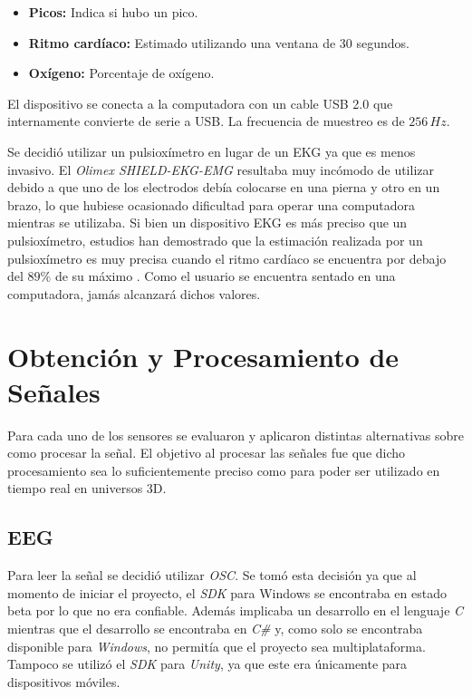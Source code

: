 \begin{itemize}
\item \textbf{Picos:}  Indica si hubo un pico.
\item \textbf{Ritmo cardíaco:} Estimado utilizando una ventana de 30 segundos.
\item \textbf{Oxígeno:} Porcentaje de oxígeno.
\end{itemize} 

El dispositivo se conecta a la computadora con un cable USB 2.0 que internamente convierte de serie a USB. La frecuencia de muestreo es de $256 \, Hz$.

Se decidió utilizar un pulsioxímetro en lugar de un EKG ya que es menos invasivo. El \emph{Olimex SHIELD-EKG-EMG} resultaba muy incómodo de utilizar debido a que uno de los electrodos debía colocarse en una pierna y otro en un brazo, lo que hubiese ocasionado dificultad para operar una computadora mientras se utilizaba. Si bien un dispositivo EKG es más preciso que un pulsioxímetro, estudios han demostrado que la estimación realizada por un pulsioxímetro es muy precisa cuando el ritmo cardíaco se encuentra por debajo del $89\% $ de su máximo \cite{spo2-accuracy}. Como el usuario se encuentra sentado en una computadora, jamás alcanzará dichos valores.

\section{Obtención y Procesamiento de Señales}

Para cada uno de los sensores se evaluaron y aplicaron distintas alternativas sobre como procesar la señal. El objetivo al procesar las señales fue que dicho procesamiento sea lo suficientemente preciso como para poder ser utilizado en tiempo real en universos 3D.

\subsection{EEG} \label{sec:eeg-signal-processing}

Para leer la señal se decidió utilizar \emph{OSC}. Se tomó esta decisión ya que al momento de iniciar el proyecto, el \emph{SDK} para Windows se encontraba en estado beta por lo que no era confiable. Además implicaba un desarrollo en el lenguaje \emph{C} mientras que el desarrollo se encontraba en \emph{C\#} y, como solo se encontraba disponible para \emph{Windows}, no permitía que el proyecto sea multiplataforma. Tampoco se utilizó el \emph{SDK} para \emph{Unity}, ya que este era únicamente para dispositivos móviles.

